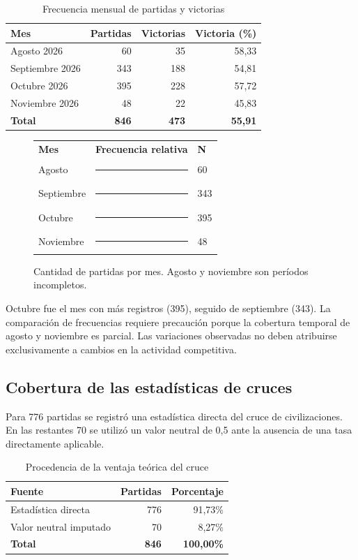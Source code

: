 \documentclass[12pt,a4paper]{article}
\begin{document}
\begin{table}[htbp]
\centering
\caption{Frecuencia mensual de partidas y victorias}
\label{tab:meses}
\begin{tabular}{lrrr}
\toprule
\textbf{Mes} & \textbf{Partidas} & \textbf{Victorias} & \textbf{Victoria (\%)}\\
\midrule
Agosto 2026 & 60 & 35 & 58,33\\
Septiembre 2026 & 343 & 188 & 54,81\\
Octubre 2026 & 395 & 228 & 57,72\\
Noviembre 2026 & 48 & 22 & 45,83\\
\midrule
\textbf{Total} & \textbf{846} & \textbf{473} & \textbf{55,91}\\
\bottomrule
\end{tabular}
\end{table}

\begin{figure}[htbp]
\centering
\begin{tabular}{@{}lcl@{}}
\textbf{Mes} & \textbf{Frecuencia relativa} & \textbf{N}\\[0.15cm]
Agosto & \rule{0.91cm}{0.25cm} & 60\\[0.15cm]
Septiembre & \rule{5.21cm}{0.25cm} & 343\\[0.15cm]
Octubre & \rule{6.0cm}{0.25cm} & 395\\[0.15cm]
Noviembre & \rule{0.73cm}{0.25cm} & 48
\end{tabular}
\caption{Cantidad de partidas por mes. Agosto y noviembre son períodos incompletos.}
\label{fig:meses}
\end{figure}

Octubre fue el mes con más registros (395), seguido de septiembre (343). La comparación de frecuencias requiere precaución porque la cobertura temporal de agosto y noviembre es parcial. Las variaciones observadas no deben atribuirse exclusivamente a cambios en la actividad competitiva.

\subsection{Cobertura de las estadísticas de cruces}

Para 776 partidas se registró una estadística directa del cruce de civilizaciones. En las restantes 70 se utilizó un valor neutral de 0,5 ante la ausencia de una tasa directamente aplicable.

\begin{table}[htbp]
\centering
\caption{Procedencia de la ventaja teórica del cruce}
\label{tab:cobertura}
\begin{tabular}{lrr}
\toprule
\textbf{Fuente} & \textbf{Partidas} & \textbf{Porcentaje}\\
\midrule
Estadística directa & 776 & 91,73\%\\
Valor neutral imputado & 70 & 8,27\%\\
\midrule
\textbf{Total} & \textbf{846} & \textbf{100,00\%}\\
\bottomrule
\end{tabular}
\end{table}
\end{document}
